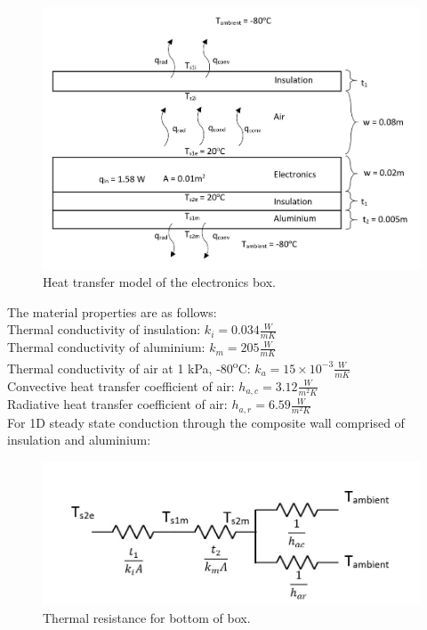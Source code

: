 	\begin{figure}[h!]
    \centering
    \includegraphics[scale=0.6]{4-experiment-design/img/mechanical/thermaldiagram.JPG}
	\caption{Heat transfer model of the electronics box.}
	\label{fig:thermaldiagram}
	\end{figure}

The material properties are as follows: \\

Thermal conductivity of insulation: $ k_{i} = 0.034 \frac{W}{m K} $ \\
Thermal conductivity of aluminium: $ k_{m} = 205 \frac{W}{m K} $ \\
Thermal conductivity of air at 1 kPa, -80\textsuperscript{o}C: $ k_{a} = 15\times10^{-3} \frac{W}{m K} $ \\ 
Convective heat transfer coefficient of air: $ h_{a,c} = 3.12 \frac{W}{m^{2} K} $ \\ 
Radiative heat transfer coefficient of air: $ h_{a,r} = 6.59 \frac{W}{m^{2} K} $ \\ 

For 1D steady state conduction through the composite wall comprised of insulation and aluminium: \\

	\begin{figure}[h!]
    \centering
    \includegraphics[scale=0.6]{4-experiment-design/img/mechanical/thermalresistance1.JPG}
	\caption{Thermal resistance for bottom of box.}
	\label{fig:thermalresistance1}
	\end{figure}

